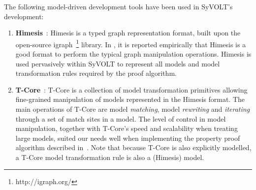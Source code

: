 The following model-driven development tools have been used in SyVOLT's
development:
\begin{enumerate}


  \item \textbf{Himesis}~\cite{Provost2006}: Himesis is a typed graph representation
  format, built upon the open-source igraph~\footnote{http://igraph.org/} library. 
In \cite{Syriani2010b}, it is reported empirically that Himesis is a good format
to perform the typical graph manipulation operations.
  Himesis is used pervasively within SyVOLT to represent all models 
  and model transformation rules required by the proof algorithm.
  
  \item \textbf{T-Core}~\cite{Syriani2010a}: T-Core is a collection of model transformation
  primitives allowing fine-grained manipulation of models represented in the
  Himesis format.
  The main operations of T-Core are model \emph{matching},
  model \emph{rewriting} and \emph{iterating} through a set of match sites in a model.
  The level of control in model manipulation, together with T-Core's speed and
  scalability when treating large models, suited our needs well when
  implementing the property proof algorithm described in~\cite{Lucio2014}. Note that because
  T-Core is also explicitly modelled, a T-Core model transformation rule is also
  a (Himesis) model.


\end{enumerate}
